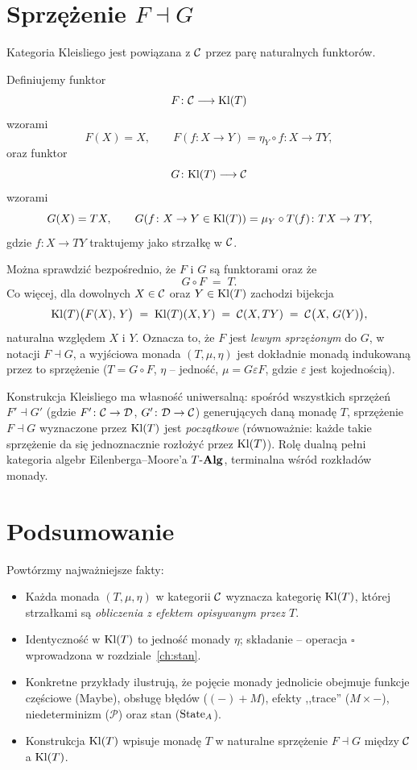 \section{Sprzężenie $F\dashv G$}

Kategoria Kleisliego jest powiązana z $\mathcal{C}$ przez parę naturalnych funktorów.

\begin{definicja}
Definiujemy funktor
\[
F\colon \mathcal{C}\longrightarrow \mathrm{Kl}(T)
\]
wzorami
\[
F(X) = X, \qquad F(f\colon X\to Y) = \eta_Y\circ f\colon X\to TY,
\]
oraz funktor
\[
G\colon \mathrm{Kl}(T)\longrightarrow \mathcal{C}
\]
wzorami
\[
G(X) = TX, \qquad G(f\colon X\to Y \in \mathrm{Kl}(T)) = \mu_Y\circ T(f)\colon TX\to TY,
\]
gdzie $f\colon X\to TY$ traktujemy jako strzałkę w $\mathcal{C}$.
\end{definicja}

\begin{uwaga}
Można sprawdzić bezpośrednio, że $F$ i $G$ są funktorami oraz że
\[
G\circ F \;=\; T.
\]
Co więcej, dla dowolnych $X\in\mathcal{C}$ oraz $Y\in\mathrm{Kl}(T)$ zachodzi bijekcja
\[
\mathrm{Kl}(T)\bigl(F(X),\, Y\bigr) \;=\; \mathrm{Kl}(T)(X,Y) \;=\; \mathcal{C}(X,TY) \;=\; \mathcal{C}\bigl(X,\, G(Y)\bigr),
\]
naturalna względem $X$ i $Y$. Oznacza to, że $F$ jest \emph{lewym sprzężonym} do $G$, w notacji $F\dashv G$, a wyjściowa monada $(T,\mu,\eta)$ jest dokładnie monadą indukowaną przez to sprzężenie ($T = G\circ F$, $\eta$ -- jedność, $\mu = G\varepsilon F$, gdzie $\varepsilon$ jest kojednością).
\end{uwaga}

\begin{uwaga}
Konstrukcja Kleisliego ma własność uniwersalną: spośród wszystkich sprzężeń $F'\dashv G'$ (gdzie $F'\colon \mathcal{C}\to\mathcal{D}$, $G'\colon \mathcal{D}\to\mathcal{C}$) generujących daną monadę $T$, sprzężenie $F\dashv G$ wyznaczone przez $\mathrm{Kl}(T)$ jest \emph{początkowe} (równoważnie: każde takie sprzężenie da się jednoznacznie rozłożyć przez $\mathrm{Kl}(T)$). Rolę dualną pełni kategoria algebr Eilenberga--Moore'a $T\text{-}\mathbf{Alg}$, terminalna wśród rozkładów monady.
\end{uwaga}

\section{Podsumowanie}

Powtórzmy najważniejsze fakty:

\begin{itemize}[leftmargin=*]
\item Każda monada $(T,\mu,\eta)$ w kategorii $\mathcal{C}$ wyznacza kategorię $\mathrm{Kl}(T)$, której strzałkami są \emph{obliczenia z efektem opisywanym przez $T$}.
\item Identyczność w $\mathrm{Kl}(T)$ to jedność monady $\eta$; składanie -- operacja $\square$ wprowadzona w rozdziale~\ref{ch:stan}.
\item Konkretne przykłady ilustrują, że pojęcie monady jednolicie obejmuje funkcje częściowe ($\mathrm{Maybe}$), obsługę błędów ($(-)+M$), efekty ,,trace'' ($M\times{-}$), niedeterminizm ($\mathcal{P}$) oraz stan ($\mathrm{State}_A$).
\item Konstrukcja $\mathrm{Kl}(T)$ wpisuje monadę $T$ w naturalne sprzężenie $F\dashv G$ między $\mathcal{C}$ a $\mathrm{Kl}(T)$.
\end{itemize}
